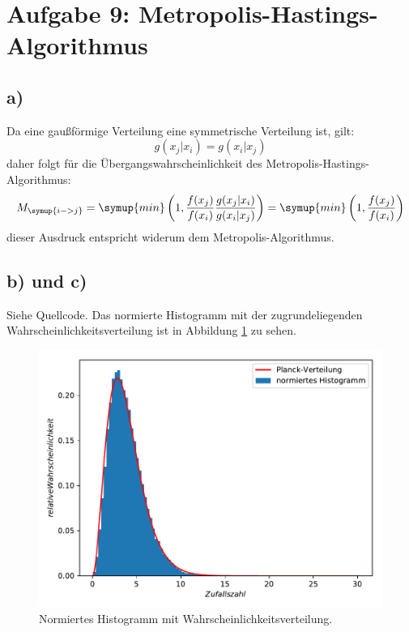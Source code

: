 \section{Aufgabe 9: Metropolis-Hastings-Algorithmus}
\subsection{a)}
Da eine gaußförmige Verteilung eine symmetrische Verteilung ist, gilt:
\begin{equation*}
  g(x_j|x_i) = g(x_i|x_j)
\end{equation*}
daher folgt für die Übergangswahrscheinlichkeit des Metropolis-Hastings-Algorithmus:
\begin{equation*}
  M_{\symup{i->j}} = \symup{min}\left(1, \frac{f(x_j)}{f(x_i)} \frac{g(x_j|x_i)}{g(x_i|x_j)}\right) =
  \symup{min}\left(1, \frac{f(x_j)}{f(x_i)}\right)
\end{equation*}
dieser Ausdruck entspricht widerum dem Metropolis-Algorithmus.

\subsection{b) und c)}
Siehe Quellcode.
Das normierte Histogramm mit der zugrundeliegenden Wahrscheinlichkeitsverteilung ist in Abbildung \ref{abb:1} zu sehen.
\begin{figure}[h]
  \centering
  \includegraphics{Metropolis.pdf}
  \caption{Normiertes Histogramm mit Wahrscheinlichkeitsverteilung.}
  \label{abb:1}
\end{figure}

